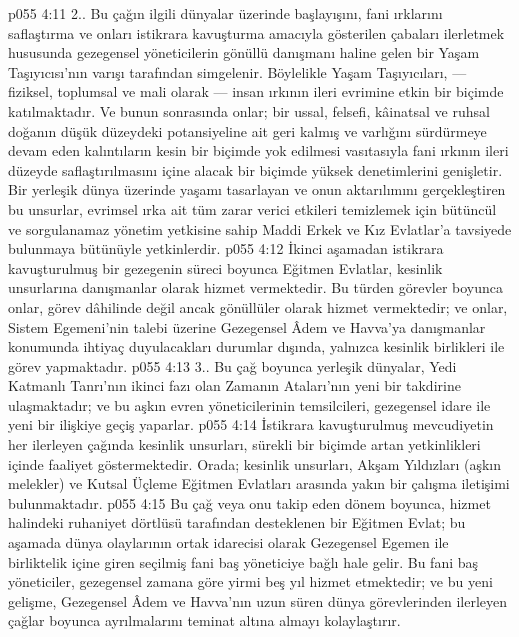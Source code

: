 \vs p055 4:11 2.\bibnobreakspace {}. Bu çağın ilgili dünyalar üzerinde başlayışını, fani ırklarını saflaştırma ve onları istikrara kavuşturma amacıyla gösterilen çabaları ilerletmek hususunda gezegensel yöneticilerin gönüllü danışmanı haline gelen bir Yaşam Taşıyıcısı’nın varışı tarafından simgelenir. Böylelikle Yaşam Taşıyıcıları, --- fiziksel, toplumsal ve mali olarak --- insan ırkının ileri evrimine etkin bir biçimde katılmaktadır. Ve bunun sonrasında onlar; bir ussal, felsefi, kâinatsal ve ruhsal doğanın düşük düzeydeki potansiyeline ait geri kalmış ve varlığını sürdürmeye devam eden kalıntıların kesin bir biçimde yok edilmesi vasıtasıyla fani ırkının ileri düzeyde saflaştırılmasını içine alacak bir biçimde yüksek denetimlerini genişletir. Bir yerleşik dünya üzerinde yaşamı tasarlayan ve onun aktarılımını gerçekleştiren bu unsurlar, evrimsel ırka ait tüm zarar verici etkileri temizlemek için bütüncül ve sorgulanamaz yönetim yetkisine sahip Maddi Erkek ve Kız Evlatlar’a tavsiyede bulunmaya bütünüyle yetkinlerdir.
\vs p055 4:12 İkinci aşamadan istikrara kavuşturulmuş bir gezegenin süreci boyunca Eğitmen Evlatlar, kesinlik unsurlarına danışmanlar olarak hizmet vermektedir. Bu türden görevler boyunca onlar, görev dâhilinde değil ancak gönüllüler olarak hizmet vermektedir; ve onlar, Sistem Egemeni’nin talebi üzerine Gezegensel Âdem ve Havva’ya danışmanlar konumunda ihtiyaç duyulacakları durumlar dışında, yalnızca kesinlik birlikleri ile görev yapmaktadır.
\vs p055 4:13 3.\bibnobreakspace {}. Bu çağ boyunca yerleşik dünyalar, Yedi Katmanlı Tanrı’nın ikinci fazı olan Zamanın Ataları’nın yeni bir takdirine ulaşmaktadır; ve bu aşkın evren yöneticilerinin temsilcileri, gezegensel idare ile yeni bir ilişkiye geçiş yaparlar.
\vs p055 4:14 İstikrara kavuşturulmuş mevcudiyetin her ilerleyen çağında kesinlik unsurları, sürekli bir biçimde artan yetkinlikleri içinde faaliyet göstermektedir. Orada; kesinlik unsurları, Akşam Yıldızları (aşkın melekler) ve Kutsal Üçleme Eğitmen Evlatları arasında yakın bir çalışma iletişimi bulunmaktadır.
\vs p055 4:15 Bu çağ veya onu takip eden dönem boyunca, hizmet halindeki ruhaniyet dörtlüsü tarafından desteklenen bir Eğitmen Evlat; bu aşamada dünya olaylarının ortak idarecisi olarak Gezegensel Egemen ile birliktelik içine giren seçilmiş fani baş yöneticiye bağlı hale gelir. Bu fani baş yöneticiler, gezegensel zamana göre yirmi beş yıl hizmet etmektedir; ve bu yeni gelişme, Gezegensel Âdem ve Havva’nın uzun süren dünya görevlerinden ilerleyen çağlar boyunca ayrılmalarını teminat altına almayı kolaylaştırır.
